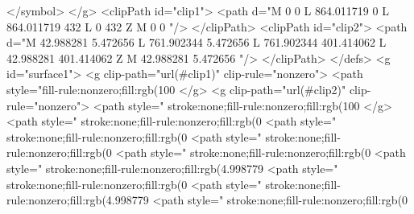</symbol>
</g>
<clipPath id="clip1">
  <path d="M 0 0 L 864.011719 0 L 864.011719 432 L 0 432 Z M 0 0 "/>
</clipPath>
<clipPath id="clip2">
  <path d="M 42.988281 5.472656 L 761.902344 5.472656 L 761.902344 401.414062 L 42.988281 401.414062 Z M 42.988281 5.472656 "/>
</clipPath>
</defs>
<g id="surface1">
<g clip-path="url(#clip1)" clip-rule="nonzero">
<path style="fill-rule:nonzero;fill:rgb(100%
</g>
<g clip-path="url(#clip2)" clip-rule="nonzero">
<path style=" stroke:none;fill-rule:nonzero;fill:rgb(100%
</g>
<path style=" stroke:none;fill-rule:nonzero;fill:rgb(0%
<path style=" stroke:none;fill-rule:nonzero;fill:rgb(0%
<path style=" stroke:none;fill-rule:nonzero;fill:rgb(0%
<path style=" stroke:none;fill-rule:nonzero;fill:rgb(0%
<path style=" stroke:none;fill-rule:nonzero;fill:rgb(4.998779%
<path style=" stroke:none;fill-rule:nonzero;fill:rgb(0%
<path style=" stroke:none;fill-rule:nonzero;fill:rgb(4.998779%
<path style=" stroke:none;fill-rule:nonzero;fill:rgb(0%
